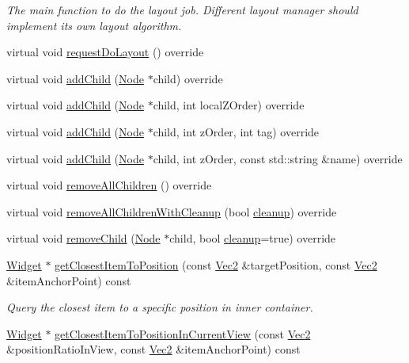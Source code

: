 \begin{DoxyCompactItemize}
\begin{DoxyCompactList}\small\item\em The main function to do the layout job. Different layout manager should implement its own layout algorithm. \end{DoxyCompactList}\item 
virtual void \hyperlink{classui_1_1ListView_ad02cdf77d0d8f0dd2586b2bc083d4750}{request\+Do\+Layout} () override
\item 
virtual void \hyperlink{classui_1_1ListView_aeee2116f21f0e89de5a2e1b9cc93e012}{add\+Child} (\hyperlink{classNode}{Node} $\ast$child) override
\item 
virtual void \hyperlink{classui_1_1ListView_a36ef7247ab78ee7019eca8c409a30356}{add\+Child} (\hyperlink{classNode}{Node} $\ast$child, int local\+Z\+Order) override
\item 
virtual void \hyperlink{classui_1_1ListView_a9963ad5969a99d1e67694cfb926f56cc}{add\+Child} (\hyperlink{classNode}{Node} $\ast$child, int z\+Order, int tag) override
\item 
virtual void \hyperlink{classui_1_1ListView_ac05cf0e2ff70c59b487662364d55eebc}{add\+Child} (\hyperlink{classNode}{Node} $\ast$child, int z\+Order, const std\+::string \&name) override
\item 
virtual void \hyperlink{classui_1_1ListView_a7e534825fe60406ed544a254b0975489}{remove\+All\+Children} () override
\item 
virtual void \hyperlink{classui_1_1ListView_a01691c095058bc86f372e6439b15b151}{remove\+All\+Children\+With\+Cleanup} (bool \hyperlink{classProtectedNode_a5462a6202b458193c1881bcdcc5be78d}{cleanup}) override
\item 
virtual void \hyperlink{classui_1_1ListView_a7002fe4ad783aeccf56cebbe4144036e}{remove\+Child} (\hyperlink{classNode}{Node} $\ast$child, bool \hyperlink{classProtectedNode_a5462a6202b458193c1881bcdcc5be78d}{cleanup}=true) override
\item 
\hyperlink{classui_1_1Widget}{Widget} $\ast$ \hyperlink{classui_1_1ListView_a1a6b73d54545ff7e1e4631185472b2eb}{get\+Closest\+Item\+To\+Position} (const \hyperlink{classVec2}{Vec2} \&target\+Position, const \hyperlink{classVec2}{Vec2} \&item\+Anchor\+Point) const
\begin{DoxyCompactList}\small\item\em Query the closest item to a specific position in inner container. \end{DoxyCompactList}\item 
\hyperlink{classui_1_1Widget}{Widget} $\ast$ \hyperlink{classui_1_1ListView_a0d21477a14d78ef1d1355bf0ab02fb80}{get\+Closest\+Item\+To\+Position\+In\+Current\+View} (const \hyperlink{classVec2}{Vec2} \&position\+Ratio\+In\+View, const \hyperlink{classVec2}{Vec2} \&item\+Anchor\+Point) const

\end{DoxyCompactItemize}

